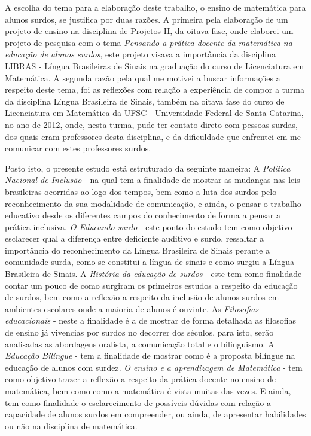 \documentclass[brasil]{abnt}
\begin{document}
	A escolha do tema para a elaboração deste trabalho, o ensino de matemática para alunos surdos, se justifica por duas razões. A primeira pela elaboração de um projeto de ensino na 
	disciplina de Projetos II, da oitava fase, onde elaborei um projeto de pesquisa com o tema \textit{Pensando a prática docente da matemática na educação de alunos surdos}, este projeto visava a importância 
	da disciplina LIBRAS - Língua Brasileiras de Sinais na graduação do curso de Licenciatura em Matemática. A segunda razão pela qual me motivei a buscar informações a respeito deste tema, foi as reflexões 
	com relação a experiência de compor a turma da disciplina Língua Brasileira de Sinais, também na oitava fase do curso de Licenciatura em Matemática da UFSC - Universidade Federal de Santa Catarina, no ano 
	de 2012, onde, nesta turma, pude ter contato direto com pessoas surdas, dos quais eram professores desta disciplina, e da dificuldade que enfrentei em me comunicar com estes professores surdos. 
	
	Posto isto, o presente estudo está estruturado da seguinte maneira: A \textit{Política Nacional de Inclusão} - na qual tem a finalidade de mostrar as mudanças nas leis brasileiras ocorridas ao logo dos 
	tempos, bem como a luta dos surdos pelo reconhecimento da sua modalidade de comunicação, e ainda, o pensar o trabalho educativo desde os diferentes campos do conhecimento de forma a pensar a prática 
	inclusiva. \textit{O Educando surdo} - este ponto do estudo tem como objetivo esclarecer qual a diferença entre deficiente auditivo e surdo, ressaltar a importância do reconhecimento da Língua Brasileira de Sinais 
	perante a comunidade surda, como se constitui a língua de sinais e como surgiu a Língua Brasileira de Sinais. A \textit{História da educação de surdos} - este tem como finalidade contar um pouco 
	de como surgiram os primeiros estudos a respeito da educação de surdos, bem como a reflexão a respeito da inclusão de alunos surdos em ambientes escolares onde a maioria de alunos é ouvinte. As 
	\textit{Filosofias educacionais} - neste a finalidade é a de mostrar de forma detalhada as filosofias de ensino já vivencias por surdos no decorrer dos séculos, para isto, serão analisadas as abordagens oralista, 
	a comunicação total e o bilinguismo. A \textit{Educação Bilíngue} - tem a finalidade de mostrar como é a proposta bilíngue na educação de alunos com surdez. \textit{O ensino e a aprendizagem de Matemática} - tem como 
	objetivo trazer a reflexão a respeito da prática docente no ensino de matemática, bem como como a matemática é vista muitas das vezes. E ainda, tem como finalidade o esclarecimento de possíveis
	dúvidas com relação a capacidade de alunos surdos em compreender, ou ainda, de apresentar habilidades ou não na disciplina de matemática.  
\end{document}
